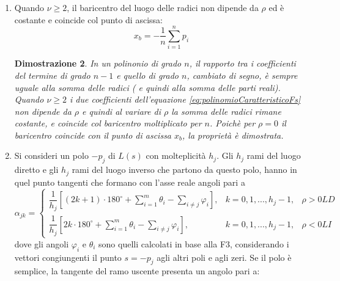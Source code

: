 \documentclass[a4paper]{report}
\newtheorem{dimostrazione}{Dimostrazione}
\begin{document}
\begin{enumerate}
\begin{dimostrazione}
    singolarit\`a complesse, produce un contributo a
    \[
    arg N(s) - arg D(s)
    \]
    nullo o pari a $\pm 360^{\circ}$. Invece per ogni
    singolarit\`a alla sua destra d\`a un contributo di $\pm
    180^{\circ}$. Affinch\`e la somma dei vari termini sia pari ad un
    multiplo dispari (o pari) di $180^{\circ}$, il punto deve essere a
    sinistra di un numero dispari (o pari) di singolarit\`a.
  \end{dimostrazione}
\item Quando $\nu \geq 2$, il baricentro del luogo delle radici non
  dipende da $\rho$ ed \`e costante e coincide col punto di ascissa:
  \begin{equation}\label{eq:xb}
    x_b = - \dfrac{1}{n} \sum_{i = 1}^{n} p_i
  \end{equation}
  \begin{dimostrazione}
    In un polinonio di grado $n$, il rapporto tra i coefficienti del
    termine di grado $n - 1$ e quello di grado $n$, cambiato di segno,
    \`e sempre uguale alla somma delle radici ( e quindi alla somma
    delle parti reali). Quando $\nu \geq 2$ i due coefficienti
    dell'equazione \ref{eq:polinomioCaratteristicoFs} non dipende da
    $\rho$ e quindi al variare di $\rho$ la somma delle radici rimane
    costante, e coincide col baricentro moltiplicato per $n$. Poich\`e
    per $\rho = 0$ il baricentro coincide con il punto di ascissa
    $x_b$, la propriet\`a \`e dimostrata.
  \end{dimostrazione}
\item Si consideri un polo $-p_j$ di $L(s)$ con molteplicit\`a
  $h_j$. Gli $h_j$ rami del luogo diretto e gli $h_j$ rami del luogo
  inverso che partono da questo polo, hanno in quel punto tangenti che
  formano con l'asse reale angoli pari a
  \[
  \alpha_{jk} =
  \left \{
  \begin{array}{lll}
    \dfrac{1}{h_j} \left[ (2k + 1) \cdot 180^{\circ} + \sum\limits_{i =
        1}^{m} \theta_i - \sum\limits_{i \neq j} \varphi_i \right], & k=0, 1,
    ..., h_j - 1, & \rho > 0 LD\\
    \dfrac{1}{h_j} \left[ 2k \cdot 180^{\circ} + \sum\limits_{i =
        1}^{m} \theta_i - \sum\limits_{i \neq j} \varphi_i \right], & k=0, 1,
    ..., h_j - 1, & \rho < 0 LI
  \end{array}
  \right .
  \]
  dove gli angoli $\varphi_i$ e $\theta_i$ sono quelli calcolati in
  base alla F3, considerando i vettori congiungenti il punto $s =
  -p_j$ agli altri poli e agli zeri. Se il polo \`e semplice, la
  tangente del ramo uscente presenta un angolo pari a:

\end{enumerate}
\end{document}
